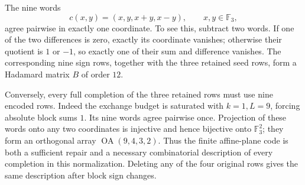 \documentclass[11pt]{article}
\begin{document}
The nine words
\[
 c(x,y)=(x,y,x+y,x-y),\qquad x,y\in\mathbb F_3,
\]
agree pairwise in exactly one coordinate. To see this, subtract two
words. If one of the two differences is zero, exactly its coordinate
vanishes; otherwise their quotient is $1$ or $-1$, so exactly one
of their sum and difference vanishes. The corresponding nine sign
rows, together with the three retained seed rows, form a Hadamard
matrix $B$ of order $12$.

Conversely, every full completion of the three retained rows must
use nine encoded rows. Indeed the exchange budget is saturated with
$k=1,L=9$, forcing absolute block sums $1$. Its nine words agree
pairwise once. Projection of these words onto any two coordinates is
injective and hence bijective onto $\mathbb F_3^2$; they form an
orthogonal array $\operatorname{OA}(9,4,3,2)$.
Thus the finite affine-plane code is both a sufficient repair and a
necessary combinatorial description of every completion in this
normalization. Deleting any of the four original rows gives the same
description after block sign changes.
\end{document}
